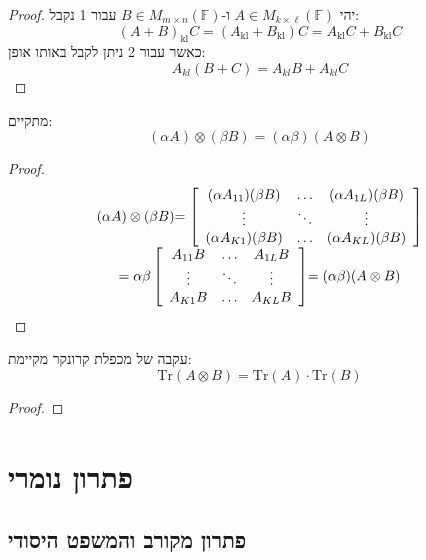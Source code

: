 \documentclass{tstextbook}
\begin{document}
\begin{proof}
יהי \(A \in M_{k\times \ell}\left( \mathbb{F}  \right)\) ו-\(B \in M_{m\times n}\left( \mathbb{F}  \right)\) עבור 1 נקבל:
$${{(A+B)_{\mathrm{{kl}}}C=(A_{\mathrm{{kl}}}+B_{\mathrm{{kl}}})C}}{{=A_{\mathrm{{kl}}}C+B_{\mathrm{{kl}}}C}}$$
כאשר עבור 2 ניתן לקבל באותו אופן:
$$A_{k l}(B+C)=A_{k l}B+A_{k l}C$$

\end{proof}
\begin{proposition}
מתקיים:
$$(\alpha A)\otimes(\beta B)=(\alpha\beta)(A\otimes B)$$

\end{proposition}
\begin{proof}
$$\begin{array}{c}{{(\alpha A)\otimes(\beta B)}} {{=\left[\begin{array}{c c c}{{(\alpha A_{11})(\beta B)}}&{{\ldots}}&{{(\alpha A_{1L})(\beta B)}}\\ {{\vdots}}&{{\ddots}}&{{\vdots}}\\ {{(\alpha A_{K1})(\beta B)}}&{{\ldots}}&{{(\alpha A_{K L})(\beta B)}}\end{array}\right]}}\\ {{=\alpha\beta\left[\begin{array}{c c c}{{A_{11}B}}&{{\ldots}}&{{A_{1L}B}}\\ {{\vdots}}&{{\ddots}}&{{\vdots}}\\ {{A_{K1}B}}&{{\ldots}}&{{A_{K L}B}}\end{array}\right]}}{{=(\alpha\beta)(A\otimes B)}}\end{array}$$

\end{proof}
\begin{proposition}
עקבה של מכפלת קרונקר מקיימת:
$$\mathrm{Tr}\left( A\otimes B \right)=\mathrm{Tr}(A)\cdot \mathrm{Tr}(B)$$

\end{proposition}
\begin{proof}
\end{proof}
\section{פתרון נומרי}

\subsection{פתרון מקורב והמשפט היסודי}
\end{document}
